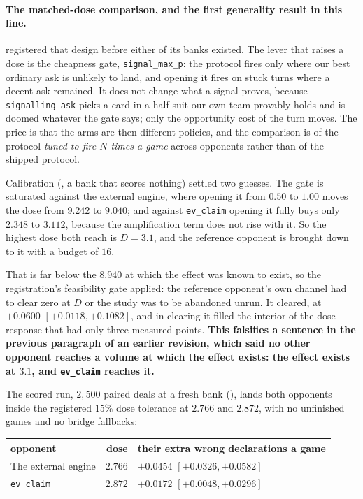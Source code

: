 \documentclass[11pt,letterpaper]{article}
\begin{document}
\paragraph{The matched-dose comparison, and the first generality result in this
line.}  registered that design before
either of its banks existed. The lever that raises a dose is the cheapness
gate, \texttt{signal\_max\_p}: the protocol fires only where our best ordinary
ask is unlikely to land, and opening it fires on stuck turns where a decent ask
remained. It does not change what a signal proves, because
\texttt{signalling\_ask} picks a card in a half-suit our own team provably
holds and is doomed whatever the gate says; only the opportunity cost of the
turn moves. The price is that the arms are then different policies, and the
comparison is of the protocol \emph{tuned to fire $N$ times a game} across
opponents rather than of the shipped protocol.

Calibration (, a bank that scores
nothing) settled two guesses. The gate is saturated against
the external engine, where opening it from $0.50$ to $1.00$ moves the dose from
$9.242$ to $9.040$; and against \texttt{ev\_claim} opening it fully buys only
$2.348$ to $3.112$, because the amplification term does not rise with it. So
the highest dose both reach is $D = 3.1$, and the reference opponent is brought
down to it with a budget of $16$.

That is far below the $8.940$ at which the effect was known to exist, so the
registration's feasibility gate applied: the reference opponent's own channel
had to clear zero at $D$ or the study was to be abandoned unrun. It cleared, at
$+0.0600$ $[+0.0118, +0.1082]$, and in clearing it filled the interior of the
dose-response that had only three measured points. \textbf{This falsifies a
sentence in the previous paragraph of an earlier revision, which said no other
opponent reaches a volume at which the effect exists: the effect exists at
$3.1$, and \texttt{ev\_claim} reaches it.}

The scored run, $2{,}500$ paired deals at a fresh bank
(), lands both opponents inside the
registered $15\%$ dose tolerance at $2.766$ and $2.872$, with no unfinished
games and no bridge fallbacks:

\begin{center}
\small
\begin{tabular}{lrl}
\toprule
opponent & dose & their extra wrong declarations a game \\
\midrule
The external engine & $2.766$ & $+0.0454$ $[+0.0326, +0.0582]$ \\
\texttt{ev\_claim}  & $2.872$ & $+0.0172$ $[+0.0048, +0.0296]$ \\
\bottomrule
\end{tabular}
\end{center}
\end{document}
